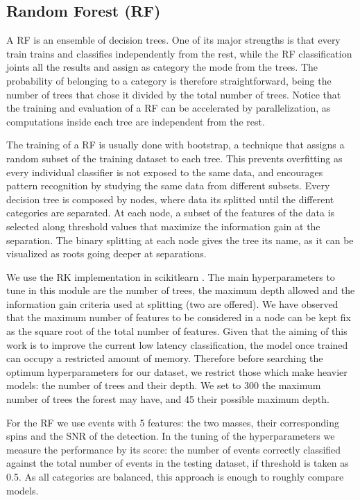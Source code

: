 \subsection{Random Forest (RF)}

A RF is an ensemble of decision trees. One of its major strengths is that every train trains and classifies independently from the rest, while the RF classification joints all the results and assign as category the mode from the trees. The probability of belonging to a category is therefore straightforward, being the number of trees that chose it divided by the total number of trees. Notice that the training and evaluation of a RF can be accelerated by parallelization, as computations inside each tree are independent from the rest.

The training of a RF is usually done with bootstrap, a technique that assigns a random subset of the training dataset to each tree. This prevents overfitting as every individual classifier is not exposed to the same data, and encourages pattern recognition by studying the same data from different subsets. Every decision tree is composed by nodes, where data its splitted until the different categories are separated. At each node, a subset of the features of the data is selected along threshold values that maximize the information gain at the separation. The binary splitting at each node gives the tree its name, as it can be visualized as roots going deeper at separations.

We use the RK implementation in scikitlearn \citep{Pedregosa:2011}. The main hyperparameters to tune in this module are the number of trees, the maximum depth allowed and the information gain criteria used at splitting (two are offered). We have observed that the maximum number of features to be considered in a node can be kept fix as the square root of the total number of features. Given that the aiming of this work is to improve the current low latency classification, the model once trained can occupy a restricted amount of memory. Therefore before searching the optimum hyperparameters for our dataset, we restrict those which make heavier models: the number of trees and their depth. We set to 300 the maximum number of trees the forest may have, and 45 their possible maximum depth.

For the RF we use events with 5 features: the two masses, their corresponding spins and the SNR of the detection. In the tuning of the hyperparameters we measure the performance  by its score: the number of events correctly classified against the total number of events in the testing dataset, if threshold is taken as 0.5. As all categories are balanced, this approach is enough to roughly compare models. 



